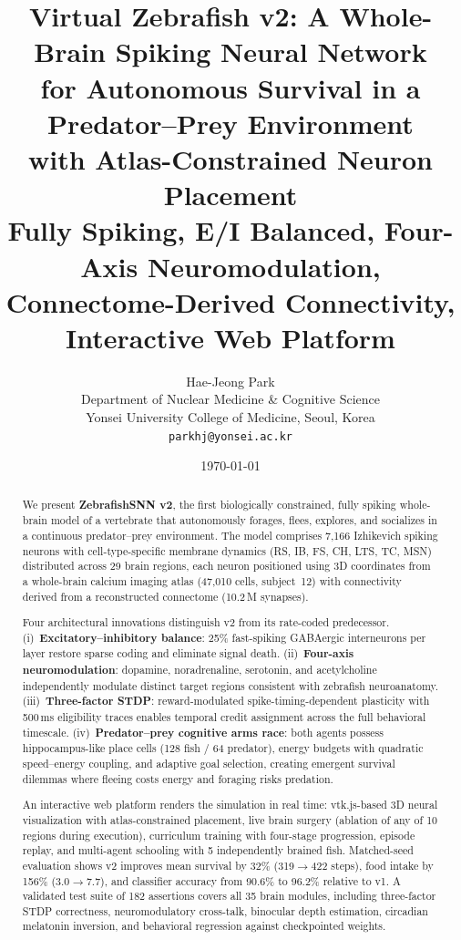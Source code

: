 \documentclass[11pt,a4paper]{article}
\title{%
  \textbf{Virtual Zebrafish v2: A Whole-Brain Spiking Neural Network\\
  for Autonomous Survival in a Predator--Prey Environment\\
  with Atlas-Constrained Neuron Placement}\\[8pt]
  \large Fully Spiking, E/I Balanced, Four-Axis Neuromodulation,\\
  \large Connectome-Derived Connectivity, Interactive Web Platform
}
\author{Hae-Jeong Park\\
  Department of Nuclear Medicine \& Cognitive Science\\
  Yonsei University College of Medicine, Seoul, Korea\\
  \texttt{parkhj@yonsei.ac.kr}
}
\date{\today}
\begin{document}
\maketitle

\begin{abstract}
We present \textbf{ZebrafishSNN v2}, the first biologically constrained,
fully spiking whole-brain model of a vertebrate that autonomously forages,
flees, explores, and socializes in a continuous predator--prey environment.
The model comprises 7,166 Izhikevich spiking neurons with cell-type-specific
membrane dynamics (RS, IB, FS, CH, LTS, TC, MSN) distributed across 29 brain
regions, each neuron positioned using 3D coordinates from a whole-brain calcium
imaging atlas (47,010 cells, subject~12) with connectivity derived from a
reconstructed connectome (10.2\,M synapses).

Four architectural innovations distinguish v2 from its rate-coded predecessor.
(i)~\textbf{Excitatory--inhibitory balance}: 25\% fast-spiking GABAergic
interneurons per layer restore sparse coding and eliminate signal death.
(ii)~\textbf{Four-axis neuromodulation}: dopamine, noradrenaline, serotonin,
and acetylcholine independently modulate distinct target regions consistent
with zebrafish neuroanatomy.
(iii)~\textbf{Three-factor STDP}: reward-modulated spike-timing-dependent
plasticity with 500\,ms eligibility traces enables temporal credit assignment
across the full behavioral timescale.
(iv)~\textbf{Predator--prey cognitive arms race}: both agents possess
hippocampus-like place cells (128 fish / 64 predator), energy budgets with
quadratic speed--energy coupling, and adaptive goal selection, creating
emergent survival dilemmas where fleeing costs energy and foraging risks predation.

An interactive web platform renders the simulation in real time: vtk.js-based
3D neural visualization with atlas-constrained placement, live brain surgery
(ablation of any of 10 regions during execution), curriculum training with
four-stage progression, episode replay, and multi-agent schooling with 5
independently brained fish.
Matched-seed evaluation shows v2 improves mean survival by 32\% (319$\to$422
steps), food intake by 156\% (3.0$\to$7.7), and classifier accuracy from
90.6\% to 96.2\% relative to v1.
A validated test suite of 182 assertions covers all 35 brain modules,
including three-factor STDP correctness, neuromodulatory cross-talk,
binocular depth estimation, circadian melatonin inversion, and
behavioral regression against checkpointed weights.
\end{abstract}
\end{document}
